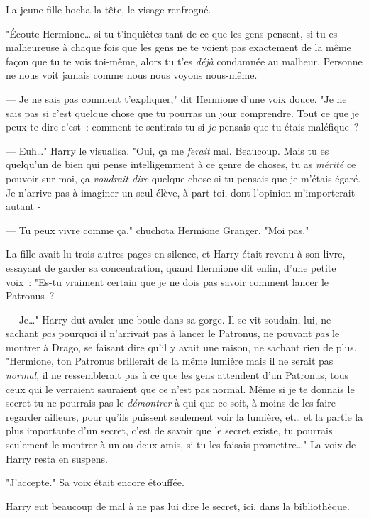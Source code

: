 La jeune fille hocha la tête, le visage renfrogné.

"Écoute Hermione… si tu t'inquiètes tant de ce que les gens pensent, si tu es malheureuse à chaque fois que les gens ne te voient pas exactement de la même façon que tu te vois toi-même, alors tu t'es \emph{déjà} condamnée au malheur. Personne ne nous voit jamais comme nous nous voyons nous-même.

--- Je ne sais pas comment t'expliquer," dit Hermione d'une voix douce. "Je ne sais pas si c'est quelque chose que tu pourras un jour comprendre. Tout ce que je peux te dire c'est~: comment te sentirais-tu si \emph{je} pensais que tu étais maléfique~?

--- Euh…" Harry le visualisa. "Oui, ça me \emph{ferait} mal. Beaucoup. Mais tu es quelqu'un de bien qui pense intelligemment à ce genre de choses, tu as \emph{mérité} ce pouvoir sur moi, ça \emph{voudrait dire} quelque chose si tu pensais que je m'étais égaré. Je n'arrive pas à imaginer un seul élève, à part toi, dont l'opinion m'importerait autant -

--- Tu peux vivre comme ça," chuchota Hermione Granger. "Moi pas."

La fille avait lu trois autres pages en silence, et Harry était revenu à son livre, essayant de garder sa concentration, quand Hermione dit enfin, d'une petite voix~: "Es-tu vraiment certain que je ne dois pas savoir comment lancer le Patronus~?

--- Je…" Harry dut avaler une boule dans sa gorge. Il se vit soudain, lui, ne sachant \emph{pas} pourquoi il n'arrivait pas à lancer le Patronus, ne pouvant \emph{pas} le montrer à Drago, se faisant dire qu'il y avait une raison, ne sachant rien de plus. "Hermione, ton Patronus brillerait de la même lumière mais il ne serait pas \emph{normal}, il ne ressemblerait pas à ce que les gens attendent d'un Patronus, tous ceux qui le verraient sauraient que ce n'est pas normal. Même si je te donnais le secret tu ne pourrais pas le \emph{démontrer} à qui que ce soit, à moins de les faire regarder ailleurs, pour qu'ils puissent seulement voir la lumière, et… et la partie la plus importante d'un secret, c'est de savoir que le secret existe, tu pourrais seulement le montrer à un ou deux amis, si tu les faisais promettre…" La voix de Harry resta en suspens.

"J'accepte." Sa voix était encore étouffée.

Harry eut beaucoup de mal à ne pas lui dire le secret, ici, dans la bibliothèque.

